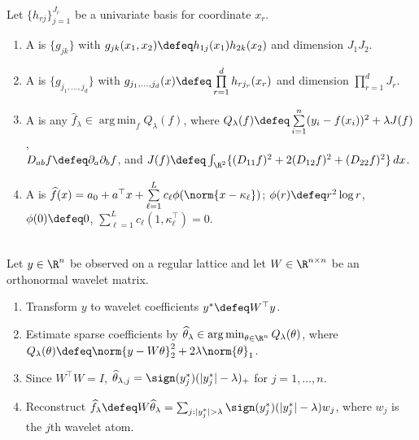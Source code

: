 \begin{definition} \label{def:sl-tensor-product-and-thin-plate-splines} \\
Let $\{h_{rj}\}_{j=1}^{J_r}$ be a univariate basis for coordinate $x_r$.
\begin{enumerate}[label=(\roman*)]
\setlength{\itemsep}{0pt}
\item A  is $\{g_{jk}\}$ with $g_{jk}(x_1,x_2)\defeq h_{1j}(x_1)h_{2k}(x_2)$ and dimension $J_1J_2$.
\item A  is $\{g_{j_1,\ldots,j_d}\}$ with $g_{j_1,\ldots,j_d}(x)\defeq\prod\limits_{r=1}^d h_{rj_r}(x_r)$ and dimension $\prod\limits_{r=1}^d J_r$.
\item A  is any $\widehat{f}_\lambda\in\operatorname*{arg\,min}_f Q_\lambda(f)$, where $Q_\lambda(f)\defeq\sum\limits_{i=1}^n(y_i-f(x_i))^2+\lambda J(f)$,\\
$D_{ab}f\defeq\partial_a\partial_b f$, and $J(f)\defeq\int_{\R^2}\{(D_{11}f)^2+2(D_{12}f)^2+(D_{22}f)^2\}\,dx$.
\item A  is $\widehat{f}(x)=a_0+a^\top x+\sum\limits_{\ell=1}^L c_\ell\phi(\norm{x-\kappa_\ell})$; $\phi(r)\defeq r^2\log r$, $\phi(0)\defeq0$, $\sum\limits_{\ell=1}^L c_\ell(1,\kappa_\ell^\top)=0$.
\end{enumerate}
\end{definition}

\begin{method} \label{meth:sl-wavelet-shrinkage} \\
Let $y\in\R^n$ be observed on a regular lattice and let $W\in\R^{n\times n}$ be an orthonormal wavelet matrix.
\begin{enumerate}[label=(\roman*)]
\setlength{\itemsep}{0pt}
\item Transform $y$ to wavelet coefficients $y^\ast\defeq W^\top y$.
\item Estimate sparse coefficients by $\widehat{\theta}_\lambda\in\operatorname*{arg\,min}_{\theta\in\R^n}Q_\lambda(\theta)$, where $Q_\lambda(\theta)\defeq\norm{y-W\theta}_2^2+2\lambda\norm{\theta}_1$.
\item Since $W^\top W=I$, $\widehat{\theta}_{\lambda,j}=\sign(y^\ast_j)(|y^\ast_j|-\lambda)_+$ for $j=1,\ldots,n$.
\item Reconstruct $\widehat{f}_\lambda\defeq W\widehat{\theta}_\lambda=\sum_{j:|y^\ast_j|>\lambda}\sign(y^\ast_j)(|y^\ast_j|-\lambda)w_j$, where $w_j$ is the $j$th wavelet atom.
\end{enumerate}
\end{method}
